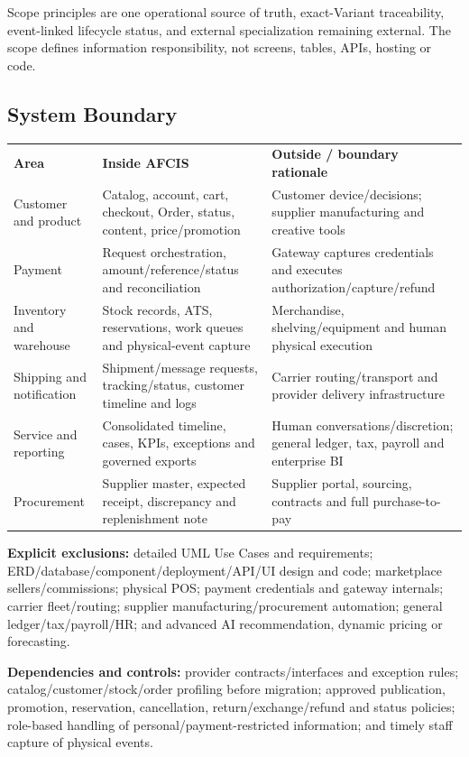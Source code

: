 \documentclass[10pt,a4paper]{article}
\begin{document}
Scope principles are one operational source of truth, exact-Variant traceability, event-linked lifecycle status, and external specialization remaining external. The scope defines information responsibility, not screens, tables, APIs, hosting or code.

\subsection{System Boundary}
\begin{tabularx}{\textwidth}{L{23mm}Y Y}
\textbf{Area} & \textbf{Inside AFCIS} & \textbf{Outside / boundary rationale}\\
Customer and product & Catalog, account, cart, checkout, Order, status, content, price/promotion & Customer device/decisions; supplier manufacturing and creative tools\\
Payment & Request orchestration, amount/reference/status and reconciliation & Gateway captures credentials and executes authorization/capture/refund\\
Inventory and warehouse & Stock records, ATS, reservations, work queues and physical-event capture & Merchandise, shelving/equipment and human physical execution\\
Shipping and notification & Shipment/message requests, tracking/status, customer timeline and logs & Carrier routing/transport and provider delivery infrastructure\\
Service and reporting & Consolidated timeline, cases, KPIs, exceptions and governed exports & Human conversations/discretion; general ledger, tax, payroll and enterprise BI\\
Procurement & Supplier master, expected receipt, discrepancy and replenishment note & Supplier portal, sourcing, contracts and full purchase-to-pay\\
\end{tabularx}

\textbf{Explicit exclusions:} detailed UML Use Cases and requirements; ERD/database/component/deployment/API/UI design and code; marketplace sellers/commissions; physical POS; payment credentials and gateway internals; carrier fleet/routing; supplier manufacturing/procurement automation; general ledger/tax/payroll/HR; and advanced AI recommendation, dynamic pricing or forecasting.

\textbf{Dependencies and controls:} provider contracts/interfaces and exception rules; catalog/customer/stock/order profiling before migration; approved publication, promotion, reservation, cancellation, return/exchange/refund and status policies; role-based handling of personal/payment-restricted information; and timely staff capture of physical events.
\end{document}
